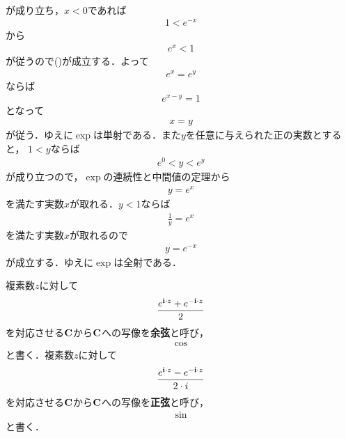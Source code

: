 \begin{sketch}
\begin{align}
		\end{align}
		が成り立ち，$x < 0$であれば
		\begin{align}
			1 < e^{-x}
		\end{align}
		から
		\begin{align}
			e^{x} < 1
		\end{align}
		が従うので()が成立する．よって
		\begin{align}
			e^x = e^y
		\end{align}
		ならば
		\begin{align}
			e^{x - y} = 1
		\end{align}
		となって
		\begin{align}
			x = y
		\end{align}
		が従う．ゆえに$\exp$は単射である．また$y$を任意に与えられた正の実数とすると，
		$1 < y$ならば
		\begin{align}
			e^{0} < y < e^{y}
		\end{align}
		が成り立つので，$\exp$の連続性と中間値の定理から
		\begin{align}
			y = e^{x}
		\end{align}
		を満たす実数$x$が取れる．$y < 1$ならば
		\begin{align}
			\frac{1}{y} = e^{x}
		\end{align}
		を満たす実数$x$が取れるので
		\begin{align}
			y = e^{-x}
		\end{align}
		が成立する．ゆえに$\exp$は全射である．
		\QED
	\end{sketch}
	
	\begin{screen}
		\begin{dfn}[三角関数]
			複素数$z$に対して
			\begin{align}
				\frac{e^{\mathbf{i} \cdot z} + e^{-\mathbf{i} \cdot z}}{2}
			\end{align}
			を対応させる$\mathbf{C}$から$\mathbf{C}$への写像を{\bf 余弦}と呼び，
			\begin{align}
				\cos
			\end{align}
			と書く．複素数$z$に対して
			\begin{align}
				\frac{e^{\mathbf{i} \cdot z} - e^{-\mathbf{i} \cdot z}}{2 \cdot i}
			\end{align}
			を対応させる$\mathbf{C}$から$\mathbf{C}$への写像を{\bf 正弦}と呼び，
			\begin{align}
				\sin
			\end{align}
			と書く．
		\end{dfn}
	\end{screen}
	
